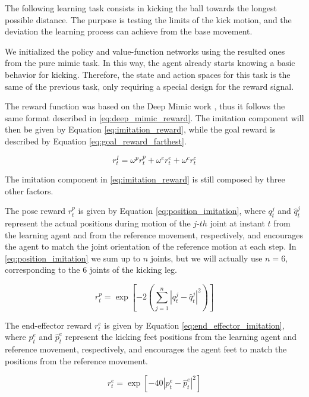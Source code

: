 The following learning task consists in kicking the ball towards the longest possible distance. The purpose is testing the limits of the kick motion, and the deviation the learning process can achieve from the base movement.

We initialized the policy and value-function networks using the resulted ones from the pure mimic task. In this way, the agent already starts knowing a basic behavior for kicking. Therefore, the state and action spaces for this task is the same of the previous task, only requiring a special design for the reward signal.

The reward function was based on the Deep Mimic work \cite{deepmimic}, thus it follows the same format described in \eqref{eq:deep_mimic_reward}. The imitation component will then be given by Equation \eqref{eq:imitation_reward}, while the goal reward is described by Equation \eqref{eq:goal_reward_farthest}.

\begin{equation}
r^I_t = \omega^p r^p_t + \omega^e r^e_t + \omega^c r^c_t
\label{eq:imitation_reward}
\end{equation}

The imitation component in \eqref{eq:imitation_reward} is still composed by three other factors.

The pose reward $r^p_t$ is given by Equation \eqref{eq:position_imitation}, where $q_t^j$ and $\hat{q}_t^j$ represent the actual positions during motion of the $j$-$th$ joint at instant $t$ from the learning agent and from the reference movement, respectively, and encourages the agent to match the joint orientation of the reference motion at each step. In \eqref{eq:position_imitation} we sum up to $n$ joints, but we will actually use $n=6$, corresponding to the 6 joints of the kicking leg.

\begin{equation}
r^p_t = \exp{ \left[ -2 \left( \sum_{j=1}^{n}{|q_t^j-\hat{q}_t^j|^2} \right) \right] }
\label{eq:position_imitation}
\end{equation}

The end-effector reward $r_t^e$ is given by Equation \eqref{eq:end_effector_imitation}, where $p_t^e$ and $\hat{p}_t^e$ represent the kicking feet positions from the learning agent and reference movement, respectively, and encourages the agent feet to match the positions from the reference movement.

\begin{equation}
r^e_t = \exp{ \left[ -40 |p_t^e-\hat{p}_t^e|^2 \right]}
\label{eq:end_effector_imitation}
\end{equation}

